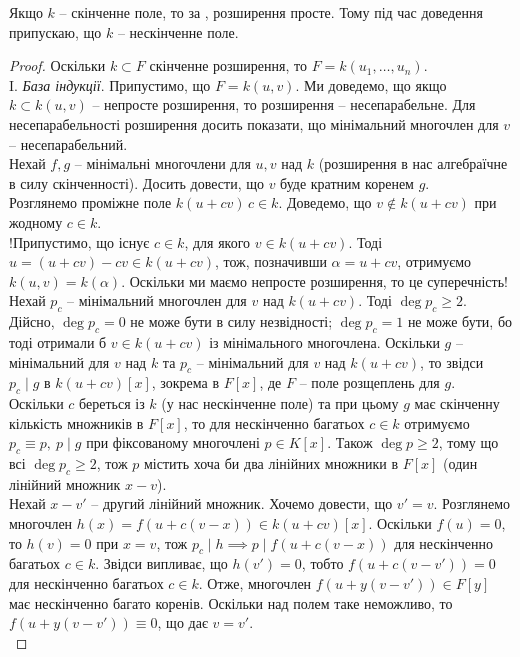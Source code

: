 \documentclass{math_library}
\begin{document}
\begin{remark}
Якщо $k$ -- скінченне поле, то за , розширення просте. Тому під час доведення припускаю, що $k$ -- нескінченне поле.
\end{remark}

\begin{proof}
Оскільки $k \subset F$ скінченне розширення, то $F = k(u_1,\dots,u_n)$.
\bigskip \\
I. \textit{База індукції}. Припустимо, що $F = k(u,v)$. Ми доведемо, що якщо $k \subset k(u,v)$ -- непросте розширення, то розширення -- несепарабельне. Для несепарабельності розширення досить показати, що мінімальний многочлен для $v$ -- несепарабельний.\\
Нехай $f,g$ -- мінімальні многочлени для $u,v$ над $k$ (розширення в нас алгебраїчне в силу скінченності). Досить довести, що $v$ буде кратним коренем $g$.\\
Розглянемо проміжне поле $k(u+cv)\, c \in k$. Доведемо, що $v \notin k(u+cv)$ при жодному $c \in k$.\\
!Припустимо, що існує $c \in k$, для якого $v \in k(u+cv)$. Тоді $u = (u+cv)-cv \in k(u+cv)$, тож, позначивши $\alpha = u + cv$, отримуємо $k(u,v) = k(\alpha)$. Оскільки ми маємо непросте розширення, то це суперечність!\\
Нехай $p_c$ -- мінімальний многочлен для $v$ над $k(u+cv)$. Тоді $\deg p_c \geq 2$. Дійсно, $\deg p_c = 0$ не може бути в силу незвідності; $\deg p_c = 1$ не може бути, бо тоді отримали б $v \in k(u+cv)$ із мінімального многочлена. Оскільки $g$ -- мінімальний для $v$ над $k$ та $p_c$ -- мінімальний для $v$ над $k(u+cv)$, то звідси $p_c \mid g$ в $k(u+cv)[x]$, зокрема в $F[x]$, де $F$ -- поле розщеплень для $g$.\\
Оскільки $c$ береться із $k$ (у нас нескінченне поле) та при цьому $g$ має скінченну кількість множників в $F[x]$, то для нескінченно багатьох $c \in k$ отримуємо $p_c \equiv p,\ p \mid g$ при фіксованому многочлені $p \in K[x]$. Також $\deg p \geq 2$, тому що всі $\deg p_c \geq 2$, тож $p$ містить хоча би два лінійних множники в $F[x]$ (один лінійний множник $x-v$).\\
Нехай $x-v'$ -- другий лінійний множник. Хочемо довести, що $v' = v$. Розглянемо многочлен $h(x) = f(u+c(v-x)) \in k(u+cv)[x]$. Оскільки $f(u) = 0$, то $h(v) = 0$ при $x = v$, тож $p_c \mid h \implies p \mid f(u+c(v-x))$ для нескінченно багатьох $c \in k$. Звідси випливає, що $h(v') = 0$, тобто $f(u+c(v-v')) = 0$ для нескінченно багатьох $c \in k$. Отже, многочлен $f(u+y(v-v')) \in F[y]$ має нескінченно багато коренів. Оскільки над полем таке неможливо, то $f(u+y(v-v')) \equiv 0$, що дає $v = v'$.\\

\end{proof}
\end{document}
